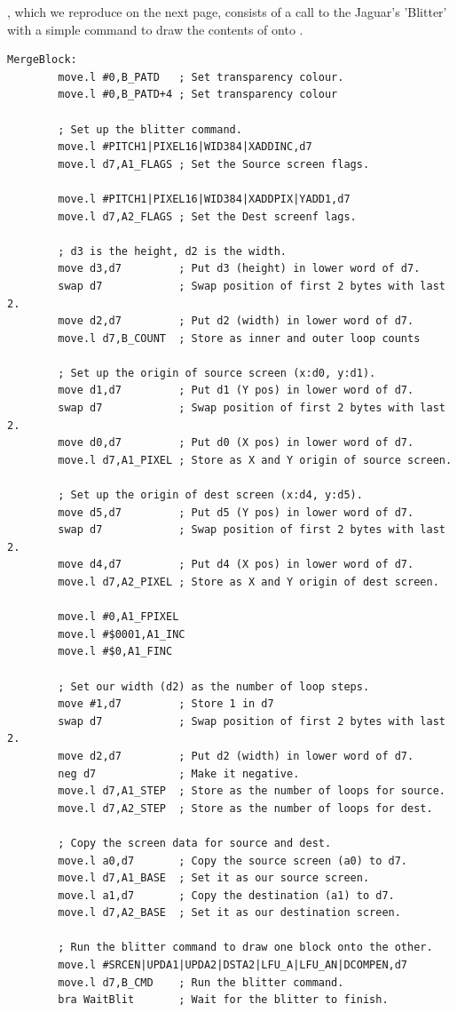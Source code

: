 , which we reproduce on the next page, consists of a call to the Jaguar's
'Blitter' with a simple command to draw the contents of  onto .
\clearpage
\begin{lstlisting}
MergeBlock:
        move.l #0,B_PATD   ; Set transparency colour.
        move.l #0,B_PATD+4 ; Set transparency colour
    
        ; Set up the blitter command.
        move.l #PITCH1|PIXEL16|WID384|XADDINC,d7
        move.l d7,A1_FLAGS ; Set the Source screen flags.
    
        move.l #PITCH1|PIXEL16|WID384|XADDPIX|YADD1,d7
        move.l d7,A2_FLAGS ; Set the Dest screenf lags.
    
        ; d3 is the height, d2 is the width.
        move d3,d7         ; Put d3 (height) in lower word of d7.
        swap d7            ; Swap position of first 2 bytes with last 2.
        move d2,d7         ; Put d2 (width) in lower word of d7.
        move.l d7,B_COUNT  ; Store as inner and outer loop counts
    
        ; Set up the origin of source screen (x:d0, y:d1). 
        move d1,d7         ; Put d1 (Y pos) in lower word of d7.
        swap d7            ; Swap position of first 2 bytes with last 2.
        move d0,d7         ; Put d0 (X pos) in lower word of d7.
        move.l d7,A1_PIXEL ; Store as X and Y origin of source screen.
    
        ; Set up the origin of dest screen (x:d4, y:d5). 
        move d5,d7         ; Put d5 (Y pos) in lower word of d7.
        swap d7            ; Swap position of first 2 bytes with last 2.
        move d4,d7         ; Put d4 (X pos) in lower word of d7.
        move.l d7,A2_PIXEL ; Store as X and Y origin of dest screen.
    
        move.l #0,A1_FPIXEL
        move.l #$0001,A1_INC
        move.l #$0,A1_FINC
    
        ; Set our width (d2) as the number of loop steps.
        move #1,d7         ; Store 1 in d7
        swap d7            ; Swap position of first 2 bytes with last 2.
        move d2,d7         ; Put d2 (width) in lower word of d7.
        neg d7             ; Make it negative.
        move.l d7,A1_STEP  ; Store as the number of loops for source.
        move.l d7,A2_STEP  ; Store as the number of loops for dest.
    
        ; Copy the screen data for source and dest.
        move.l a0,d7       ; Copy the source screen (a0) to d7.
        move.l d7,A1_BASE  ; Set it as our source screen.
        move.l a1,d7       ; Copy the destination (a1) to d7.
        move.l d7,A2_BASE  ; Set it as our destination screen.
    
        ; Run the blitter command to draw one block onto the other.
        move.l #SRCEN|UPDA1|UPDA2|DSTA2|LFU_A|LFU_AN|DCOMPEN,d7
        move.l d7,B_CMD    ; Run the blitter command.
        bra WaitBlit       ; Wait for the blitter to finish.
\end{lstlisting}
